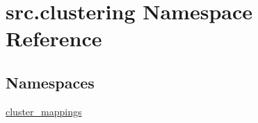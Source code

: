\hypertarget{namespacesrc_1_1clustering}{}\section{src.\+clustering Namespace Reference}
\label{namespacesrc_1_1clustering}
\subsection*{Namespaces}
\begin{DoxyCompactItemize}
\item 
 \hyperlink{namespacesrc_1_1clustering_1_1cluster__mappings}{cluster\+\_\+mappings}
\end{DoxyCompactItemize}
